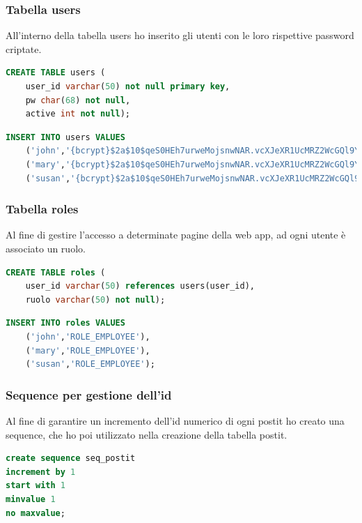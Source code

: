\subsubsection{Tabella users}
All'interno della tabella users ho inserito gli utenti con le loro rispettive password criptate.
\begin{lstlisting}[language=sql,basicstyle=\small, caption={Creazione tabella users}, captionpos=b]
CREATE TABLE users (
    user_id varchar(50) not null primary key,
    pw char(68) not null,
    active int not null);
\end{lstlisting}
\begin{lstlisting}[language=sql,basicstyle=\small, caption={Inserimento dati degli utenti in users}, captionpos=b]
INSERT INTO users VALUES
    ('john','{bcrypt}$2a$10$qeS0HEh7urweMojsnwNAR.vcXJeXR1UcMRZ2WcGQl9YeuspUdgF.q',1),
    ('mary','{bcrypt}$2a$10$qeS0HEh7urweMojsnwNAR.vcXJeXR1UcMRZ2WcGQl9YeuspUdgF.q',1),
    ('susan','{bcrypt}$2a$10$qeS0HEh7urweMojsnwNAR.vcXJeXR1UcMRZ2WcGQl9YeuspUdgF.q',1);
\end{lstlisting}

\subsubsection{Tabella roles}
Al fine di gestire l'accesso a determinate pagine della web app, ad ogni utente è associato un ruolo.
\begin{lstlisting}[language=sql,basicstyle=\small, caption={Creazione tabella roles}, captionpos=b]
CREATE TABLE roles (
    user_id varchar(50) references users(user_id),
    ruolo varchar(50) not null);
\end{lstlisting}
\begin{lstlisting}[language=sql,basicstyle=\small, caption={Inserimento dei ruoli nella tabella}, captionpos=b]
INSERT INTO roles VALUES
    ('john','ROLE_EMPLOYEE'),
    ('mary','ROLE_EMPLOYEE'),
    ('susan','ROLE_EMPLOYEE');
\end{lstlisting}

\subsubsection{Sequence per gestione dell'id}
Al fine di garantire un incremento dell'id numerico di ogni postit ho creato una sequence, che ho poi utilizzato nella creazione della tabella postit.
\begin{lstlisting}[language=sql,basicstyle=\small, caption={Creazione della sequence per l'id del postit}, captionpos=b]
create sequence seq_postit
increment by 1
start with 1
minvalue 1
no maxvalue;
\end{lstlisting}

